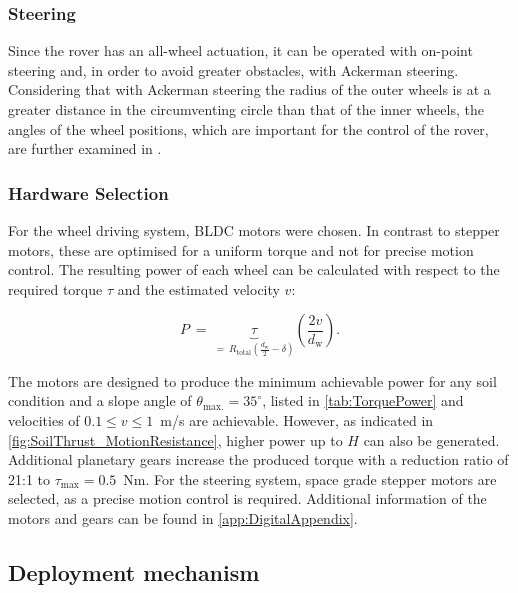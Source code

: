 \subsubsection*{Steering}
\label{sec:Steering}

Since the rover has an all-wheel actuation, it can be operated with on-point steering and, in order to avoid greater obstacles, with Ackerman steering. Considering that with Ackerman steering the radius of the outer wheels is at a greater distance in the circumventing circle than that of the inner wheels, the angles of the wheel positions, which are important for the control of the rover, are further examined in .



\subsubsection*{Hardware Selection}
\label{sec:HardwareLoco}

For the wheel driving system, BLDC motors were chosen. In contrast to stepper motors, these are optimised for a uniform torque and not for precise motion control. The resulting power of each wheel can be calculated with respect to the required torque \(\tau\) and the estimated velocity \(v\):

\begin{equation}
	P \:  = \:	\underbrace{\tau}_{= \:	R_\text{total} \left(\frac{d_\text{w}}{2} - \delta \right)} \left(\frac{2v}{d_\text{w}} \right).
	\label{eq:power}
\end{equation}

The motors are designed to produce the minimum achievable power for any soil condition and a slope angle of \(\theta_\text{max.} = 35^\circ\), listed in \autoref{tab:TorquePower} and velocities of \(0.1 \leq v \leq 1\)~m/s are achievable. However, as indicated in \autoref{fig:SoilThrust_MotionResistance}, higher power up to \(H\) can also be generated. Additional planetary gears increase the produced torque with a reduction ratio of 21:1 to \(\tau_\text{max} = 0.5\)~Nm. For the steering system, space grade stepper motors are selected, as a precise motion control is required. Additional information of the motors and gears can be found in \autoref{app:DigitalAppendix}.


\subsection{Deployment mechanism}

